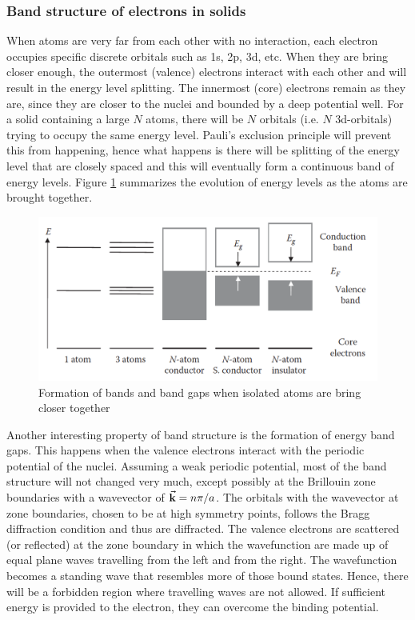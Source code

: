 \subsubsection{Band structure of electrons in solids}
When atoms are very far from each other with no interaction, each electron occupies specific discrete orbitals such as 1s, 2p, 3d, etc. When they are bring  closer enough, the outermost (valence) electrons interact with each other and will result in the  energy level splitting. The innermost (core) electrons remain as they are, since they are closer to the nuclei and bounded by a deep potential well. For a solid containing a large $N$ atoms, there will be $N$ orbitals (i.e. $N$ 3d-orbitals) trying to occupy the same energy level. Pauli's exclusion principle will prevent this from happening, hence what happens is there will be splitting of the energy level that are closely spaced and this will eventually form a continuous band of energy levels. Figure \ref{fig:band_model} summarizes the evolution of energy levels as the atoms are brought together.

\begin{figure}[tbh!]
	\centering
	\includegraphics[width=0.7\linewidth]{"images/band model"}
	\caption[Band structure in solids]{Formation of bands and band gaps when isolated atoms are bring closer together}
	\label{fig:band_model}
\end{figure}

Another interesting property of band structure is the formation of energy band gaps. This happens when the valence electrons interact with the periodic potential of the nuclei. Assuming a weak periodic potential, most of the band structure will not changed very much, except possibly at the Brillouin zone boundaries with a wavevector of $\va{k} = n \pi/ a$. The orbitals with the wavevector at zone boundaries, chosen to be at high symmetry points, follows the Bragg diffraction condition and thus are diffracted. The valence electrons are scattered (or reflected) at the zone boundary in which the wavefunction are made up of equal plane waves travelling from the left and from the right. The wavefunction becomes a standing wave that resembles more of those bound states. Hence, there will be a forbidden region where travelling waves are not allowed. If sufficient energy is provided to the electron, they can overcome the  binding potential.

